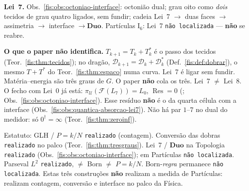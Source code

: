 \documentclass[livro.tex]{subfiles}
\begin{document}
\begin{observacao}
\medskip\noindent\textbf{Lei~7.}
Obs.~\ref{fis:obs:octoniao-interface}:
octonião dual; grau oito como \emph{dois}
tecidos de grau quatro ligados, sem fundir;
cadeia
Lei~7 \(\to\) duas faces \(\to\)
assimetria \(\to\) interface
\(\to\mathbf{Duo}\).
Partículas \(\mathrm{I}_{6}\): Lei~7
\texttt{não localizada} ---
\textbf{não} se reabre.

\medskip\noindent\textbf{O que o paper
não identifica.}
\(T_{k+1}=T_{k}+T_{k}^{*}\) é o passo
dos tecidos (Teor.~\ref{fis:thm:tecidos});
no dragão, \(\mathcal{D}_{k+1}=\mathcal{D}_{k}+\mathcal{D}_{k}^{*}\)
(Def.~\ref{fis:def:dobrar}), o mesmo
\(T+T^{*}\) do Teor.~\ref{fis:thm:espaco}
numa curva.
Lei~7 é ligar sem fundir.
Matéria--energia são três graus de \(G\).
O paper \textbf{não} cola os três.
Lei~7 \(\neq\) Lei~8.
O fecho com Lei~0 já está:
\(\pi_{\mathcal{U}}(\mathcal{F}(L_7))=L_0\),
\(\operatorname{Res}=0\)
(;
Obs.~\ref{fis:obs:octoniao-interface}).
Esse resíduo \textbf{não} é o da
quarta célula com a interface
(Obs.~\ref{fis:obs:quantica-absorcao-lei7}).
Não há par \(1\)--\(7\) no dual do
medidor: só \(0^{\dagger}=\infty\)
(Teor.~\ref{fis:thm:zeroinf}).

\medskip\noindent Estatuto:
GLH / \(P=k/N\) \texttt{realizado}
(contagem). Conversão das dobras
\texttt{realizado} no palco
(Teor.~\ref{fis:thm:tresgraus}).
Lei~7 / \(\mathbf{Duo}\) na Topologia
\texttt{realizado}
(Obs.~\ref{fis:obs:octoniao-interface});
em Partículas \texttt{não localizada}.
Parseval \(L^{2}\) \texttt{realizado},
\(\neq\) Born \(\neq\) \(P=k/N\).
Born-\emph{regra} permanece
\texttt{não localizada}.
Estas três construções \textbf{não}
realizam a medida de Partículas:
realizam contagem, conversão e
interface no palco da Física.
\end{observacao}
\end{document}
